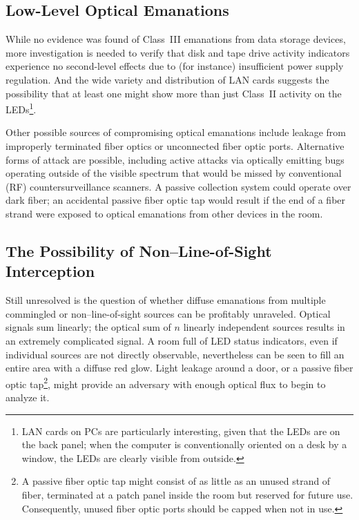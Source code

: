 \documentclass{acmtrans2e}
\begin{document}
\subsection{Low-Level Optical Emanations}

While no evidence was found of Class~III emanations from data storage 
devices, more investigation is needed to verify that disk and tape drive 
activity indicators experience no second-level effects due to (for instance)
insufficient power supply regulation.  And the wide variety and 
distribution of LAN cards suggests the possibility that at least one 
might show more than just Class~II activity on the LEDs\footnote{LAN 
cards on PCs are particularly interesting, given that the LEDs are on 
the back panel; when the computer is conventionally oriented on a desk
by a window, the LEDs are clearly visible from outside.}.

Other possible sources of compromising optical emanations include 
leakage from improperly terminated fiber optics or unconnected fiber 
optic ports.  Alternative forms of attack are possible, including active 
attacks via optically emitting bugs operating outside of the visible 
spectrum that would be missed by conventional (RF) countersurveillance 
scanners.  A passive collection system could operate over dark fiber;
an accidental passive fiber optic tap would result if the end of a fiber
strand were exposed to optical emanations from other devices in the room.

\subsection{The Possibility of Non--Line-of-Sight Interception}

Still unresolved is the question of whether diffuse emanations from 
multiple commingled or non--line-of-sight sources can be profitably
unraveled.  Optical signals sum linearly; the optical sum of $n$ linearly
independent
sources results in an extremely complicated signal.  A room full of
LED status indicators, even if individual sources
are not directly observable, nevertheless can be seen to fill an entire area with
a diffuse red glow.  Light leakage around a door, or a passive fiber optic 
tap\footnote{A passive fiber optic tap might consist of as little as an
unused strand of fiber, terminated at a patch panel inside the room but
reserved for future use.  Consequently, unused fiber optic ports should be
capped when not in use.}, might provide an adversary with enough optical
flux to begin to analyze it.
\end{document}

